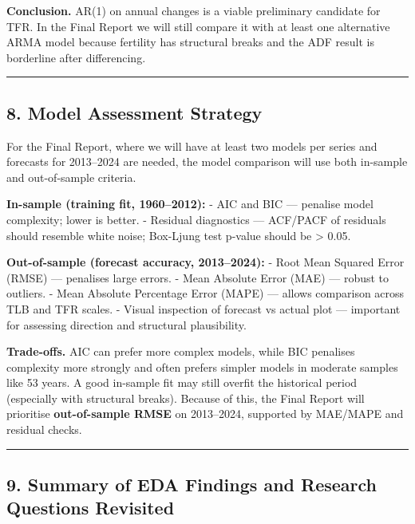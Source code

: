 \documentclass[
]{article}
\begin{document}
\textbf{Conclusion.} AR(1) on annual changes is a viable preliminary
candidate for TFR. In the Final Report we will still compare it with at
least one alternative ARMA model because fertility has structural breaks
and the ADF result is borderline after differencing.

\begin{center}\rule{0.5\linewidth}{0.5pt}\end{center}

\subsection{8. Model Assessment
Strategy}\label{model-assessment-strategy}

For the Final Report, where we will have at least two models per series
and forecasts for 2013--2024 are needed, the model comparison will use
both in-sample and out-of-sample criteria.

\textbf{In-sample (training fit, 1960--2012):} - AIC and BIC ---
penalise model complexity; lower is better. - Residual diagnostics ---
ACF/PACF of residuals should resemble white noise; Box-Ljung test
p-value should be \textgreater{} 0.05.

\textbf{Out-of-sample (forecast accuracy, 2013--2024):} - Root Mean
Squared Error (RMSE) --- penalises large errors. - Mean Absolute Error
(MAE) --- robust to outliers. - Mean Absolute Percentage Error (MAPE)
--- allows comparison across TLB and TFR scales. - Visual inspection of
forecast vs actual plot --- important for assessing direction and
structural plausibility.

\textbf{Trade-offs.} AIC can prefer more complex models, while BIC
penalises complexity more strongly and often prefers simpler models in
moderate samples like 53 years. A good in-sample fit may still overfit
the historical period (especially with structural breaks). Because of
this, the Final Report will prioritise \textbf{out-of-sample RMSE} on
2013--2024, supported by MAE/MAPE and residual checks.

\begin{center}\rule{0.5\linewidth}{0.5pt}\end{center}

\subsection{9. Summary of EDA Findings and Research Questions
Revisited}\label{summary-of-eda-findings-and-research-questions-revisited}
\end{document}
